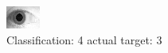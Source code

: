 \begin{figure}[h!]
\begin{center}
\includegraphics[width=0.60\columnwidth]{figures/ID1894_class_4_target_3.png}
\end{center}
\caption{ Classification: 4 actual target: 3}
\label{fig:ID1894_class_4_target_3}
\end{figure}
